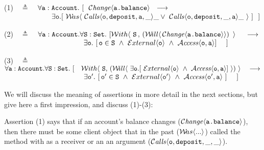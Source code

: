 (1)\ \  $\triangleq$\ \ $\forall \prg{a}:\prg{Account}.\ [\ \  \Changes{\prg{a.balance}}  \ \    
    \longrightarrow \ \    \hfill$ \\
  $\strut \hspace{2.3cm} 
 \exists \prg{o}. [\  \Past{\ \Calls{\prg{o}}{\prg{deposit}}{\prg{a}}{\_}{\_} \vee\  \Calls{\prg{o}}{\prg{deposit}}{\_}{\prg{a}}{\_}\ } \ ] \ \ ] \hfill $

\vspace{.4cm}

    (2)\ \  $\triangleq$\ \ $\forall \prg{a}:\prg{Account}.\forall \prg{S}:\prg{Set}.\ [    \Using{(\Future{\,\Changes{\prg{a.balance}}})\,}{\prg{S}\,}\ \ \   \
    \longrightarrow$ \\
 $\strut \hspace{3.9cm} \hfill \exists \prg{o}.\ [\, \prg{o}\in \prg{S}\ \wedge\  \External{\prg{o}}  \ \wedge \ \CanAccess{\prg{o}}{\prg{a}}    ] \ \ \ \ ]$
\vspace{.4cm} 
 
     (3)\ \  $\triangleq$\ \ $\forall \prg{a}:\prg{Account}.\forall \prg{S}:\prg{Set}.\ [ \ \ \ {\Using{(\Future{\ \exists \prg{o}.[\ \External{\prg{o}} \ \wedge\ \CanAccess{\prg{o}}{\prg{a}}]\ })}{\SF}} \  \ \
    \longrightarrow$ \\
 $\strut \hspace{3.9cm} \hfill \exists \prg{o}'.\ [\, \prg{o}'\in \prg{S}\  \wedge  \ \External{\prg{o}'}  \ \wedge \ \CanAccess{\prg{o}'}{\prg{a}}   \ ] \ \ \ \ ]$

\vspace{.2cm}

We will discuss the meaning of  \Chainmail assertions in more detail in the next sections, but 
give here a first impression, and discuss (1)-(3):
 
Assertion (1) %
says that if   an account's balance changes
($\Changes{\prg{a.balance}}$),
then there must be some client object 
that in the past (${\Past{...}}$) called the  method with  as a receiver or an an argument 
($\Calls{\prg{o}} {\prg{deposit}} {\_} {\_}$).
 
